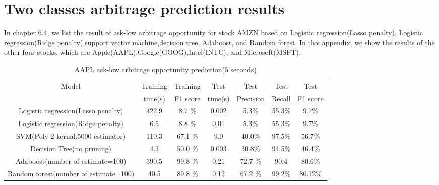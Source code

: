 \chapter{Two classes arbitrage prediction results}
In chapter 6.4, we list the result of  ask-low arbitrage opportunity for stock AMZN based on Logistic regression(Lasso penalty), Logistic regression(Ridge penalty),support vector machine,decision tree, Adaboost, and Random forest.  In this appendix, we show the results of the other four stocks, which are Apple(AAPL),Google(GOOG),Intel(INTC), and Microsoft(MSFT). \\

\begin{table}[htp!]
	\caption{AAPL ask-low arbitrage opportunity prediction(5 seconds)}
	\label{ask_low_prediction}
	\begin{center}
		\begin{tabular}{|c|c|c|c|c|c|c|}
			\hline
			 Model& Training & Training  & Test  & Test & Test & Test \\[5pt]
			 & time(s) & F1 score & time(s) & Precision & Recall & F1 score \\[5pt]
			 \hline
			 Logistic regression(Lasso penalty)& 422.9 & 8.7 \% & 0.002 & 5.3\% & 55.3\%& 9.7\%\\[5pt]
			 Logistic regression(Ridge penalty)& 6.5 & 8.8 \% & 0.01 &  5.3\% & 55.3\%& 9.7\%\\[5pt]
			 SVM(Poly 2 kernal,5000 estimator)& 110.3 & 67.1 \% & 9.0 &  40.0\% & 97.5\%& 56.7\%\\[5pt]
			 Decision Tree(no pruning)& 4.3 & 50.0 \% & 0.003 &  30.8\% & 94.5\%& 46.4\%\\[5pt]
			 Adaboost(number of estimate=100)& 390.5 & 99.8 \% & 0.21 & 72.7 \% & 90.4 &  80.6\% \\[5pt]
			 Random forest(number of estimate=100)& 40.5 & 89.8 \% & 0.12 & 67.2 \% & 99.2\% &  80.12\% \\[5pt]		 	
	 		\hline 
		\end{tabular}
	\end{center}
\end{table}


